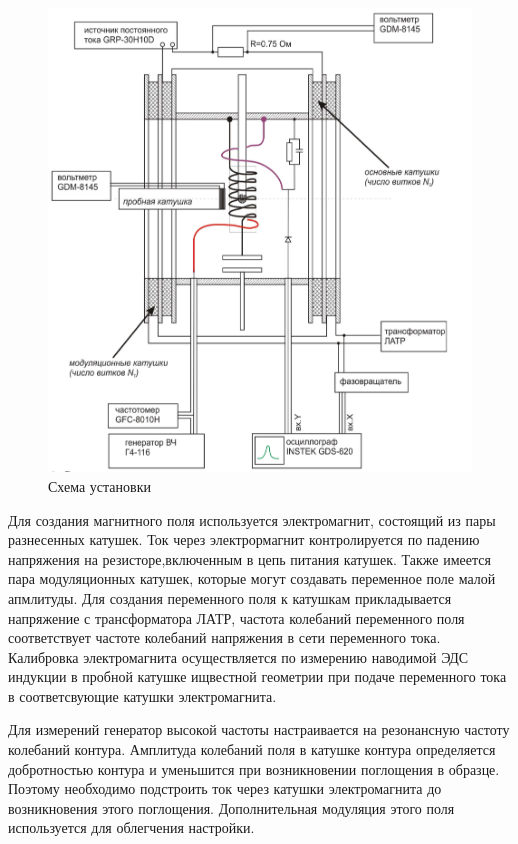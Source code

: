 \documentclass[a4paper]{article}
\begin{document}
\begin{figure}[H]
    \begin{center}
    \includegraphics[scale = 0.8]{setup.png}
    \caption{Схема установки}
    \label{setup}
    \end{center}
\end{figure}

Для создания магнитного поля используется электромагнит, состоящий из пары разнесенных катушек. Ток через 
электрормагнит контролируется по падению напряжения на резисторе,включенным в цепь питания катушек. Также имеется 
пара модуляционных катушек, которые могут создавать переменное поле малой апмлитуды. Для создания переменного 
поля к катушкам прикладывается напряжение с трансформатора ЛАТР, частота колебаний переменного поля соответствует частоте колебаний 
напряжения в сети переменного тока. Калибровка электромагнита осуществляется по измерению наводимой ЭДС индукции в пробной 
катушке ищвестной геометрии при подаче переменного тока в соответсвующие катушки электромагнита.  \par 

Для измерений генератор высокой частоты настраивается на резонансную частоту колебаний контура. Амплитуда колебаний 
поля в катушке контура определяется добротностью контура и уменьшится при возникновении поглощения в образце. 
Поэтому необходимо подстроить ток через катушки электромагнита до возникновения этого поглощения. Дополнительная модуляция этого 
поля используется для облегчения настройки.  \par 
\end{document}
